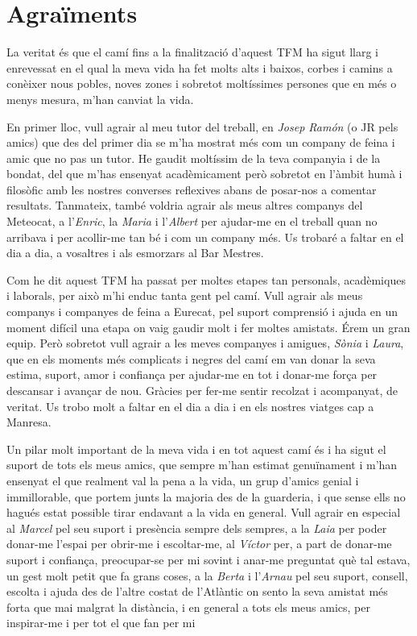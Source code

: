 \documentclass[../main.tex]{subfiles}
\begin{document}

\chapter*{Agraïments}\label{ch:akw}

La veritat és que el camí fins a la finalització d'aquest TFM ha sigut llarg i enrevessat en el qual la meva vida ha fet molts alts i baixos, corbes i camins a conèixer nous pobles, noves zones i sobretot moltíssimes persones que en més o menys mesura, m'han canviat la vida.

En primer lloc, vull agrair al meu tutor del treball, en \textit{Josep Ramón} (o JR pels amics) que des del primer dia se m'ha mostrat més com un company de feina i amic que no pas un tutor. He gaudit moltíssim de la teva companyia i de la bondat, del que m'has ensenyat acadèmicament però sobretot en l'àmbit humà i filosòfic amb les nostres converses reflexives abans de posar-nos a comentar resultats. Tanmateix, també voldria agrair als meus altres companys del Meteocat, a l'\textit{Enric}, la \textit{Maria} i l'\textit{Albert} per ajudar-me en el treball quan no arribava i per acollir-me tan bé i com un company més. Us trobaré a faltar en el dia a dia, a vosaltres i als esmorzars al Bar Mestres.

Com he dit aquest TFM ha passat per moltes etapes tan personals, acadèmiques i laborals, per això m'hi enduc tanta gent pel camí. Vull agrair als meus companys i companyes de feina a Eurecat, pel suport comprensió i ajuda en un moment difícil una etapa on vaig gaudir molt i fer moltes amistats. Érem un gran equip. Però sobretot vull agrair a les meves companyes i amigues, \textit{Sònia} i \textit{Laura}, que en els moments més complicats i negres del camí em van donar la seva estima, suport, amor i confiança per ajudar-me en tot i donar-me força per descansar i avançar de nou. Gràcies per fer-me sentir recolzat i acompanyat, de veritat. Us trobo molt a faltar en el dia a dia i en els nostres viatges cap a Manresa.

Un pilar molt important de la meva vida i en tot aquest camí és i ha sigut el suport de tots els meus amics, que sempre m'han estimat genuïnament i m'han ensenyat el que realment val la pena a la vida, un grup d'amics genial i immillorable, que portem junts la majoria des de la guarderia, i que sense ells no hagués estat possible tirar endavant a la vida en general. Vull agrair en especial al \textit{Marcel} pel seu suport i presència sempre dels sempres, a la \textit{Laia} per poder donar-me l'espai per obrir-me i escoltar-me, al \textit{Víctor} per, a part de donar-me suport i confiança, preocupar-se per mi sovint i anar-me preguntat què tal estava, un gest molt petit que fa grans coses, a la \textit{Berta} i l'\textit{Arnau} pel seu suport, consell, escolta i ajuda des de l'altre costat de l'Atlàntic on sento la seva amistat més forta que mai malgrat la distància, i en general a tots els meus amics, per inspirar-me i per tot el que fan per mi
\end{document}

